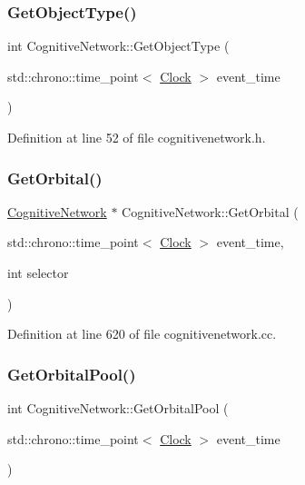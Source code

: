 \subsubsection{\texorpdfstring{Get\+Object\+Type()}{GetObjectType()}}
{\footnotesize\ttfamily int Cognitive\+Network\+::\+Get\+Object\+Type (\begin{DoxyParamCaption}\item[{std\+::chrono\+::time\+\_\+point$<$ \mbox{\hyperlink{universe_8h_a0ef8d951d1ca5ab3cfaf7ab4c7a6fd80}{Clock}} $>$}]{event\+\_\+time }\end{DoxyParamCaption})\hspace{0.3cm}{\ttfamily [inline]}}



Definition at line 52 of file cognitivenetwork.\+h.

\mbox{\label{class_cognitive_network_a69655ef1e12bac5f74c2eb85c72720f4}} 
\subsubsection{\texorpdfstring{Get\+Orbital()}{GetOrbital()}}
{\footnotesize\ttfamily \mbox{\hyperlink{class_cognitive_network}{Cognitive\+Network}} $\ast$ Cognitive\+Network\+::\+Get\+Orbital (\begin{DoxyParamCaption}\item[{std\+::chrono\+::time\+\_\+point$<$ \mbox{\hyperlink{universe_8h_a0ef8d951d1ca5ab3cfaf7ab4c7a6fd80}{Clock}} $>$}]{event\+\_\+time,  }\item[{int}]{selector }\end{DoxyParamCaption})}



Definition at line 620 of file cognitivenetwork.\+cc.

\mbox{\label{class_cognitive_network_af5995eaa4ba35c555a6b65d895451f25}} 
\subsubsection{\texorpdfstring{Get\+Orbital\+Pool()}{GetOrbitalPool()}}
{\footnotesize\ttfamily int Cognitive\+Network\+::\+Get\+Orbital\+Pool (\begin{DoxyParamCaption}\item[{std\+::chrono\+::time\+\_\+point$<$ \mbox{\hyperlink{universe_8h_a0ef8d951d1ca5ab3cfaf7ab4c7a6fd80}{Clock}} $>$}]{event\+\_\+time }\end{DoxyParamCaption})\hspace{0.3cm}{\ttfamily [inline]}}



